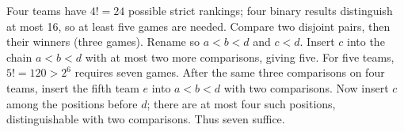 Four teams have $4!=24$ possible strict rankings; four binary results distinguish at most 16, so at least five games are needed. Compare two disjoint pairs, then their winners (three games). Rename so $a<b<d$ and $c<d$. Insert $c$ into the chain $a<b<d$ with at most two more comparisons, giving five. For five teams, $5!=120>2^6$ requires seven games. After the same three comparisons on four teams, insert the fifth team $e$ into $a<b<d$ with two comparisons. Now insert $c$ among the positions before $d$; there are at most four such positions, distinguishable with two comparisons. Thus seven suffice.
